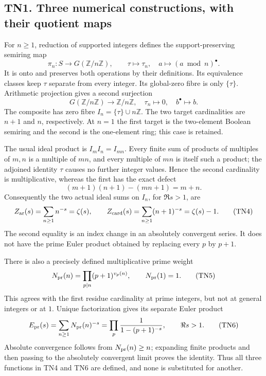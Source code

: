 \documentclass[
  10pt,
  a4paper,
]{article}
\newcounter{none} %
\begin{document}
\subsection{TN1. Three numerical constructions, with their quotient
maps}\label{tn1.-three-numerical-constructions-with-their-quotient-maps}

For \(n\ge1\), reduction of supported integers defines the
support-preserving semiring map \[
\pi_n:S\longrightarrow G(\mathbb Z/n\mathbb Z),\qquad
\tau\longmapsto\tau_n,\quad a\longmapsto(a\bmod n)^\bullet.
\tag{TN1}
\] It is onto and preserves both operations by their definitions. Its
equivalence classes keep \(\tau\) separate from every integer. Its
global-zero fibre is only \(\{\tau\}\). Arithmetic projection gives a
second surjection \[
G(\mathbb Z/n\mathbb Z)\longrightarrow\mathbb Z/n\mathbb Z,
\quad\tau_n\longmapsto0,\quad b^\bullet\longmapsto b.
\tag{TN2}
\] The composite has zero fibre \(I_n=\{\tau\}\cup n\mathbb Z\). The two
target cardinalities are \(n+1\) and \(n\), respectively. At \(n=1\) the
first target is the two-element Boolean semiring and the second is the
one-element ring; this case is retained.

The usual ideal product is \(I_mI_n=I_{mn}\). Every finite sum of
products of multiples of \(m,n\) is a multiple of \(mn\), and every
multiple of \(mn\) is itself such a product; the adjoined identity
\(\tau\) causes no further integer values. Hence the second cardinality
is multiplicative, whereas the first has the exact defect \[
(m+1)(n+1)-(mn+1)=m+n.
\tag{TN3}
\] Consequently the two actual ideal sums on \(I_n\), for \(\Re s>1\),
are \[
Z_{\rm ar}(s)=\sum_{n\ge1}n^{-s}=\zeta(s),\qquad
Z_{\rm card}(s)=\sum_{n\ge1}(n+1)^{-s}=\zeta(s)-1.
\tag{TN4}
\] The second equality is an index change in an absolutely convergent
series. It does not have the prime Euler product obtained by replacing
every \(p\) by \(p+1\).

There is also a precisely defined multiplicative prime weight \[
N_{\rm pr}(n)=\prod_{p\mid n}(p+1)^{v_p(n)},\qquad N_{\rm pr}(1)=1.
\tag{TN5}
\] This agrees with the first residue cardinality at prime integers, but
not at general integers or at \(1\). Unique factorization gives its
separate Euler product \[
E_{\rm pr}(s)=\sum_{n\ge1}N_{\rm pr}(n)^{-s}
=\prod_p\frac1{1-(p+1)^{-s}},\qquad \Re s>1.
\tag{TN6}
\] Absolute convergence follows from \(N_{\rm pr}(n)\ge n\); expanding
finite products and then passing to the absolutely convergent limit
proves the identity. Thus all three functions in TN4 and TN6 are
defined, and none is substituted for another.
\end{document}
